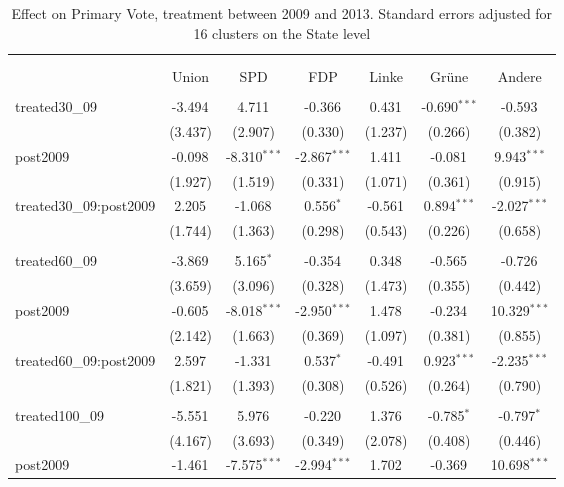 \documentclass[12pt]{article}
\begin{document}
 
\begin{table}[!htbp] \centering
  \caption{Effect on Primary Vote, treatment between 2009 and 2013. Standard errors adjusted for 16 clusters on the State level}
\begin{tabular}{@{\extracolsep{5pt}}lcccccc}
\\[-1.8ex]\hline
\hline \\[-1.8ex]
\\[-1.8ex] & \multicolumn{1}{c}{Union} & \multicolumn{1}{c}{SPD} & \multicolumn{1}{c}{FDP} & \multicolumn{1}{c}{Linke} & \multicolumn{1}{c}{Grüne} & \multicolumn{1}{c}{Andere}  \\
\hline \\[-1.8ex]
 treated30_09 & -3.494$^{}$ & 4.711$^{}$ & -0.366$^{}$ & 0.431$^{}$ & -0.690$^{***}$ & -0.593$^{}$ \\
  & (3.437) & (2.907) & (0.330) & (1.237) & (0.266) & (0.382) \\
 post2009 & -0.098$^{}$ & -8.310$^{***}$ & -2.867$^{***}$ & 1.411$^{}$ & -0.081$^{}$ & 9.943$^{***}$ \\
  & (1.927) & (1.519) & (0.331) & (1.071) & (0.361) & (0.915) \\
 treated30_09:post2009 & 2.205$^{}$ & -1.068$^{}$ & 0.556$^{*}$ & -0.561$^{}$ & 0.894$^{***}$ & -2.027$^{***}$ \\
  & (1.744) & (1.363) & (0.298) & (0.543) & (0.226) & (0.658) \\
\hline \\[-1.8ex]
 treated60_09 & -3.869$^{}$ & 5.165$^{*}$ & -0.354$^{}$ & 0.348$^{}$ & -0.565$^{}$ & -0.726$^{}$ \\
  & (3.659) & (3.096) & (0.328) & (1.473) & (0.355) & (0.442) \\
 post2009 & -0.605$^{}$ & -8.018$^{***}$ & -2.950$^{***}$ & 1.478$^{}$ & -0.234$^{}$ & 10.329$^{***}$ \\
  & (2.142) & (1.663) & (0.369) & (1.097) & (0.381) & (0.855) \\
 treated60_09:post2009 & 2.597$^{}$ & -1.331$^{}$ & 0.537$^{*}$ & -0.491$^{}$ & 0.923$^{***}$ & -2.235$^{***}$ \\
  & (1.821) & (1.393) & (0.308) & (0.526) & (0.264) & (0.790) \\
\hline \\[-1.8ex]
 treated100_09 & -5.551$^{}$ & 5.976$^{}$ & -0.220$^{}$ & 1.376$^{}$ & -0.785$^{*}$ & -0.797$^{*}$ \\
  & (4.167) & (3.693) & (0.349) & (2.078) & (0.408) & (0.446) \\
 post2009 & -1.461$^{}$ & -7.575$^{***}$ & -2.994$^{***}$ & 1.702$^{}$ & -0.369$^{}$ & 10.698$^{***}$ \\

\end{tabular}
\end{table}
\end{document}
